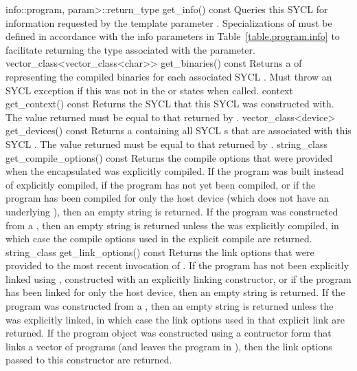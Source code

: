     {info::program, param>::return_type}
    { get_info() const}
    {
      Queries this SYCL  for information requested by the template parameter .
      Specializations of  must be defined in accordance with the info parameters in Table~\ref{table.program.info} to facilitate returning the type associated with the  parameter.
    }
    \addRow
    {vector_class<vector_class<char>> get_binaries() const}
    {
      Returns a  of  representing the compiled binaries for each associated SYCL . Must throw an  SYCL exception if this  was not in the  or  states when called.
    }
  \addRow
    {context get_context() const}
    {
        Returns the SYCL  that this SYCL  was constructed with.
        The value returned must be equal to that returned by .
        }
  \addRow
    {vector_class<device> get_devices() const}
    {
        Returns a  containing all SYCL s that are associated with this SYCL .
        The value returned must be equal to that returned by .
    }
  \addRow
    {string_class get_compile_options() const}
    {
       Returns the compile options that were provided when the encapsulated  was explicitly compiled.  If the program was built instead of explicitly compiled, if the program has not yet been compiled, or if the program has been compiled for only the host device (which does not have an underlying ), then an empty string is returned.  If the program was constructed from a , then an empty string is returned unless the  was explicitly compiled, in which case the compile options used in the explicit compile are returned.
    }
  \addRow
    {string_class get_link_options() const}
    {
       Returns the link options that were provided to the most recent invocation of .  If the program has not been explicitly linked using , constructed with an explicitly linking constructor, or if the program has been linked for only the host device, then an empty string is returned.  If the program was constructed from a , then an empty string is returned unless the  was explicitly linked, in which case the link options used in that explicit link are returned.  If the program object was constructed using a contructor form that links a vector of programs (and leaves the program in ), then the link options passed to this constructor are returned.
    }
